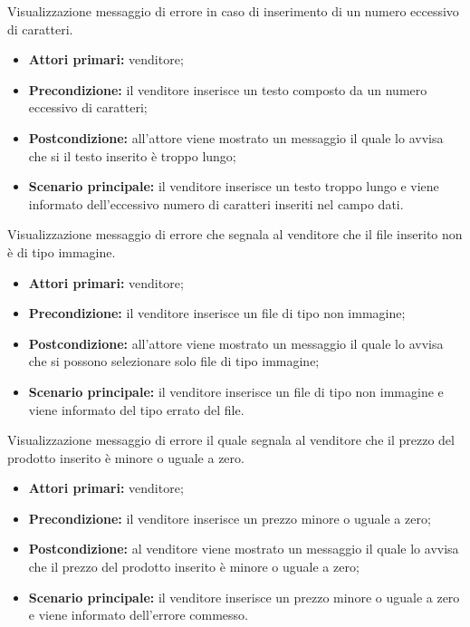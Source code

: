 \hypertarget{TroppiCaratteri}{}
Visualizzazione messaggio di errore in caso di inserimento di un numero eccessivo di caratteri.
\begin{itemize}
	\item \textbf{Attori primari:} venditore;
	\item \textbf{Precondizione:} il venditore inserisce un testo composto da un numero eccessivo di caratteri;
	\item \textbf{Postcondizione:} all'attore viene mostrato un messaggio il quale lo avvisa che si il testo inserito è troppo lungo;
	\item \textbf{Scenario principale:} il venditore inserisce un testo troppo lungo e viene informato dell'eccessivo numero di caratteri inseriti nel campo dati.
\end{itemize}

\hypertarget{NoImmagine}{}
Visualizzazione messaggio di errore che segnala al venditore che il file inserito non è di tipo immagine.
\begin{itemize}
    \item \textbf{Attori primari:} venditore;
    \item \textbf{Precondizione:} il venditore inserisce un file di tipo non immagine;
    \item \textbf{Postcondizione:} all'attore viene mostrato un messaggio il quale lo avvisa che si possono selezionare solo file di tipo immagine;
    \item \textbf{Scenario principale:} il venditore inserisce un file di tipo non immagine e viene informato del tipo errato del file.
\end{itemize}

\hypertarget{PrezzoErrato}{}
Visualizzazione messaggio di errore il quale segnala al venditore che il prezzo del prodotto inserito è minore o uguale a zero.
\begin{itemize}
    \item \textbf{Attori primari:} venditore;
    \item \textbf{Precondizione:} il venditore inserisce un prezzo minore o uguale a zero;
    \item \textbf{Postcondizione:} al venditore viene mostrato un messaggio il quale lo avvisa che il prezzo del prodotto inserito è minore o uguale a zero;
    \item \textbf{Scenario principale:} il venditore inserisce un prezzo minore o uguale a zero e viene informato dell'errore commesso.
\end{itemize}

